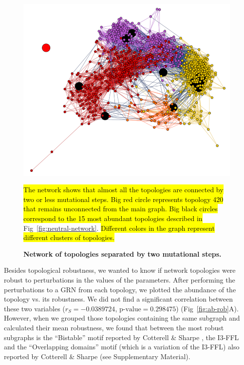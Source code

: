 \documentclass[10pt,letterpaper]{article}
\newcommand{\hil}[1]{\hl{#1}} %
\begin{document}
\begin{figure}
 \includegraphics[width=\textwidth]{figures/results/Fig5}
 \caption{\bf Network of topologies separated by two mutational steps.}
 \hil{The network shows that almost all the topologies are connected by two or less
 mutational steps. Big red circle represents topology 420 that remains
 unconnected from the main graph. Big black circles correspond to the 15
 most abundant topologies described in} Fig~\ref{fig:neutral-network}.
 \hil{Different colors in the graph represent different clusters of topologies.}
 \label{fig:2neut-net}
\end{figure}

Besides topological robustness, we wanted to know if network topologies were
robust to perturbations in the values of the parameters. After performing the
perturbations to a GRN from each topology, we plotted the abundance of the
topology vs. its robustness. We did not find a significant correlation between
these two variables ($r_S = −0.0389724$, $\text{p-value} = 0.298475$)
(Fig~\ref{fig:ab-rob}A). However, when we grouped those topologies containing
the same subgraph and calculated their mean robustness, we found that between
the most robust subgraphs is the ``Bistable'' motif reported by Cotterell \&
Sharpe \cite{Cotterell2010}, the I3-FFL and the ``Overlapping domains'' motif
(which is a variation of the I3-FFL) also reported by Cotterell \& Sharpe (see
Supplementary Material).
\end{document}
